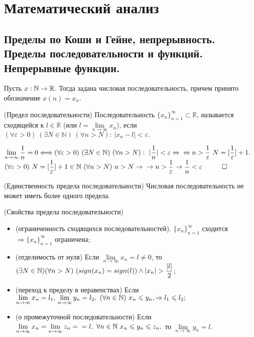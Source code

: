 \chapter{Математический анализ}

\begin{multicols}{2}
    \raggedcolumns 
    \section{Пределы по Коши и Гейне, непрерывность. Пределы последовательности и функций. Непрерывные функции.}
    Пусть $x: \N \to \R$. Тогда задана числовая последовательность, причем принято обозначение $x(n) = x_n.$
    \begin{definition}{(Предел последовательности)}{}
        Последовательность $\{x_n\}_{n=1}^\infty \subset \mathbb R$, называется сходящейся к $l \in \mathbb R$ (или $l = \lim\limits_{n\to \infty}x_n$), если $(\forall \varepsilon > 0)\  (\exists N\in \mathbb N)\ (\forall n > N):\ |x_n-l| < \varepsilon.$  
    \end{definition}
\Ex $\lim\limits_{n\to\infty} \dfrac{1}{n} = 0 \Longleftrightarrow (\forall \varepsilon > 0)\ (\exists N \in \mathbb N)\ (\forall n > N):\ |\dfrac{1}{n}| < \varepsilon \Leftrightarrow \\ \Leftrightarrow n > \dfrac{1}{\varepsilon} \ N = [\dfrac{1}{\varepsilon}] + 1.$ $(\forall \varepsilon > 0) \ N = [\dfrac{1}{\varepsilon}] + 1 \in \mathbb N \ (\forall n > N)\ n>N\rightarrow \\ \rightarrow n > \dfrac{1}{\varepsilon} \rightarrow \dfrac{1}{n} < \varepsilon \hspace{1cm} \square$
\begin{theorema}{(Единственность предела последовательности)}{}
    Числовая последовательность не может иметь более одного предела.
\end{theorema}
\begin{theorema}{(Свойства предела последовательности)}{}
    \begin{itemize}    \item (ограниченность сходящихся последовательностей). $\{x_n\}_{n=1}^\infty$ сходится $\Rightarrow \{x_n\}_{n=1}^\infty$ ограничена; \item (отделимость от нуля) Если $\lim\limits_{n\to \infty} x_n = l \neq 0$, то $(\exists N \in \mathbb N)\\(\forall n > N)\ (sign(x_n) = sign(l))\wedge |x_n|>\dfrac{|l|}{2}$; \item (переход к пределу в неравенствах) Если $\lim\limits_{n\to\infty} x_n = l_1,\\ \lim\limits_{n\to\infty} y_n = l_2,\ (\forall n \in \mathbb N)\ x_n \leq y_n, \Rightarrow l_1\leq l_2;$ \item (о промежуточной последовательности) Если $\lim\limits_{n\to\infty} x_n = \lim\limits_{n\to\infty} z_n =\\ = l,\ \forall n \in \mathbb N\ x_n \leq y_n \leq z_n, $ то $\lim\limits_{n\to\infty} y_n = l.$ \end{itemize}
\end{theorema}


\end{multicols}
